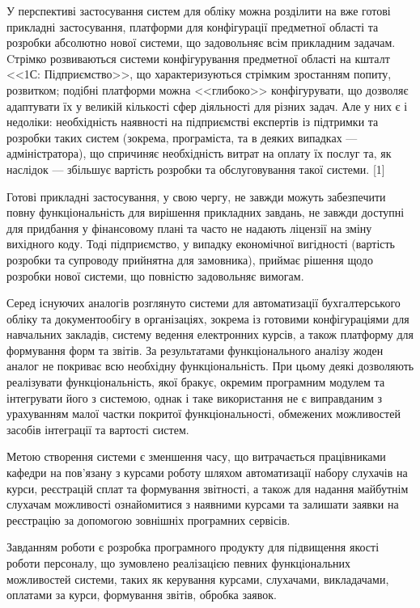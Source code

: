 \begin{sloppy}
У перспективі застосування систем для обліку можна розділити на вже готові прикладні застосування, платформи для конфігурації предметної області та розробки абсолютно нової системи, що задовольняє всім прикладним задачам. Cтрімко розвиваються системи конфігурування предметної області на кшталт <<1С: Підприємство>>, що характеризуються стрімким зростанням попиту, розвитком; подібні платформи можна <<глибоко>> конфігурувати, що дозволяє адаптувати їх у великій кількості сфер діяльності для різних задач. Але у них є і недоліки: необхідність наявності на підприємстві експертів із підтримки та розробки таких систем (зокрема, програміста, та в деяких випадках --- адміністратора), що спричиняє необхідність витрат на оплату їх послуг та, як наслідок --- збільшує вартість розробки та обслуговування такої системи. [1]

Готові прикладні застосування, у свою чергу, не завжди можуть забезпечити повну функціональність для вирішення прикладних завдань, не завжди доступні для придбання у фінансовому плані та часто не надають ліцензії на зміну вихідного коду. Тоді підприємство, у випадку економічної вигідності (вартість розробки та супроводу прийнятна для замовника), приймає рішення щодо розробки нової системи, що повністю задовольняє вимогам.

Серед існуючих аналогів розглянуто системи для автоматизації бухгалтерського обліку та документообігу в організаціях, зокрема із готовими конфігураціями для навчальних закладів, систему ведення електронних курсів, а також платформу для формування форм та звітів. За результатами функціонального аналізу жоден аналог не покриває всю необхідну функціональність. При цьому деякі дозволяють реалізувати функціональність, якої бракує, окремим програмним модулем та інтегрувати його з системою, однак і таке використання не є виправданим з урахуванням малої частки покритої функціональності, обмежених можливостей засобів інтеграції та вартості систем.

Метою створення системи є зменшення часу, що витрачається працівниками кафедри на пов'язану з курсами роботу шляхом автоматизації набору слухачів на курси, реєстрацій сплат та формування звітності, а також для надання майбутнім слухачам можливості ознайомитися з наявними курсами та залишати заявки на реєстрацію за допомогою зовнішніх програмних сервісів.

Завданням роботи є розробка програмного продукту для підвищення якості роботи персоналу, що зумовлено реалізацією певних функціональних можливостей системи, таких як керування курсами, слухачами, викладачами, оплатами за курси, формування звітів, обробка заявок.


\end{sloppy}

